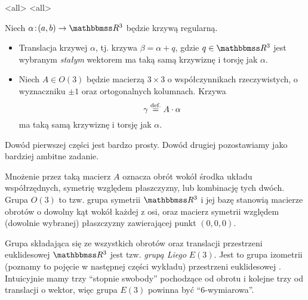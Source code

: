 \mode*
\mode<all>{}
\mode<all>{}
\begin{frame}[<+->]
\begin{lemat}
Niech $\alpha\colon (a,b)\to \R^3$ będzie krzywą regularną. 
\begin{itemize}
\item Translacja krzywej $\alpha$, tj. krzywa $\beta=\alpha+q$, gdzie $q\in \R^3$ jest wybranym \textit{stałym} wektorem ma taką samą krzywiznę i torsję jak $\alpha$.
\item Niech $A\in O(3)$ będzie macierzą $3\times 3$ o współczynnikach rzeczywistych, o wyznaczniku $\pm1$ oraz ortogonalnych kolumnach. Krzywa \[\gamma\define A\cdot\alpha\] ma taką samą krzywiznę i torsję jak $\alpha$.
\end{itemize}
\end{lemat}

\begin{uwaga}
Dowód pierwszej części jest bardzo prosty. Dowód drugiej pozostawiamy jako bardziej ambitne zadanie.
\end{uwaga}

\end{frame}
\begin{frame}[<+->]

Mnożenie przez taką macierz $A$ oznacza obrót wokół środka układu współrzędnych, symetrię względem płaszczyzny, lub kombinację tych dwóch. Grupa $O(3)$ to tzw. grupa symetrii $\R^3$ i jej bazę stanowią macierze obrotów o dowolny kąt wokół każdej z osi, oraz macierz symetrii względem (dowolnie wybranej) płaszczyzny zawierającej punkt $(0,0,0)$.

\end{frame}
\begin{uwaga}
Grupa składająca się ze wszystkich obrotów oraz translacji przestrzeni euklidesowej $\R^3$ jest tzw. \textit{grupą Liego} $E(3)$. Jest to grupa izometrii (poznamy to pojęcie w następnej części wykładu) przestrzeni euklidesowej . Intuicyjnie mamy trzy ``stopnie swobody'' pochodzące od obrotu i kolejne trzy od translacji o wektor, więc grupa $E(3)$ powinna być ``$6$-wymiarowa''. 
\end{uwaga}


